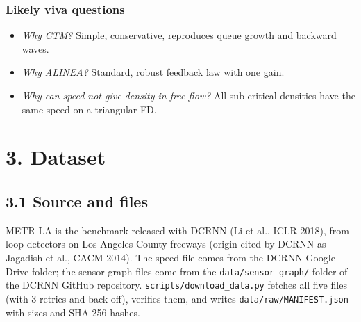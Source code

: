 \documentclass[10pt,a4paper]{article}
\begin{document}
\subsubsection*{Likely viva questions}
\begin{itemize}[nosep,leftmargin=*]
\item \emph{Why CTM?} Simple, conservative, reproduces queue growth and backward waves.
\item \emph{Why ALINEA?} Standard, robust feedback law with one gain.
\item \emph{Why can speed not give density in free flow?} All sub-critical densities have the same speed on a triangular FD.
\end{itemize}

\section*{3. Dataset}
\subsection*{3.1 Source and files}
METR-LA is the benchmark released with DCRNN (Li et al., ICLR 2018), from loop detectors on Los Angeles County freeways (origin cited by DCRNN as Jagadish et al., CACM 2014). The speed file comes from the DCRNN Google Drive folder; the sensor-graph files come from the \texttt{data/\allowbreak{}sensor\_\allowbreak{}graph/\allowbreak{}} folder of the DCRNN GitHub repository. \texttt{scripts/\allowbreak{}download\_\allowbreak{}data.py} fetches all five files (with 3 retries and back-off), verifies them, and writes \texttt{data/\allowbreak{}raw/\allowbreak{}MANIFEST.json} with sizes and SHA-256 hashes.
\end{document}
